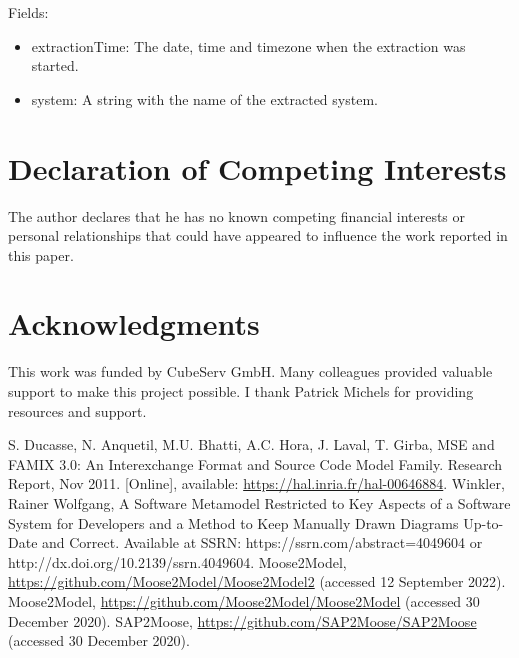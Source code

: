 \documentclass[preprint,12pt]{elsarticle}
\begin{document}
Fields:
\begin{itemize}
\item extractionTime: The date, time and timezone when the extraction was started.
\item system: A string with the name of the extracted system.
\end{itemize}


\section*{Declaration of Competing Interests} 
The author declares that he has no known competing financial interests or personal relationships that could have appeared to influence the work reported in this paper.

\section*{Acknowledgments}

This work was funded by CubeServ GmbH.
Many colleagues provided valuable support to make this project possible.
I thank
Patrick Michels for providing resources and support.



\begin{thebibliography}{00}
S. Ducasse, N. Anquetil, M.U. Bhatti, A.C. Hora, J. Laval, T. Girba, MSE and FAMIX 3.0: An Interexchange Format and Source Code Model Family. Research Report, Nov 2011. [Online], available: \url{https://hal.inria.fr/hal-00646884}.
Winkler, Rainer Wolfgang, A Software Metamodel Restricted to Key Aspects of a Software System for Developers and a Method to Keep Manually Drawn Diagrams Up-to-Date and Correct. Available at SSRN: https://ssrn.com/abstract=4049604 or http://dx.doi.org/10.2139/ssrn.4049604.
Moose2Model, \url{https://github.com/Moose2Model/Moose2Model2} (accessed 12 September 2022).
Moose2Model, \url{https://github.com/Moose2Model/Moose2Model} (accessed 30 December 2020).
SAP2Moose, \url{https://github.com/SAP2Moose/SAP2Moose} (accessed 30 December 2020).

\end{thebibliography}
\end{document}
